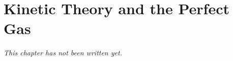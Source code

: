 \chapter{Kinetic Theory and the Perfect Gas}\label{ch:b1:kinetic-theory}


\emph{This chapter has not been written yet.}
